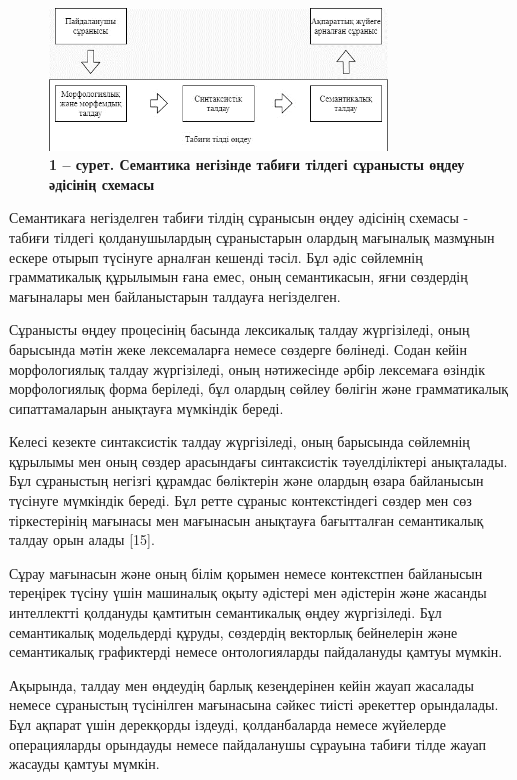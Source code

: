 \begin{figure}[H]
	\centering
	\includegraphics[width=0.8\textwidth]{assets/142}
	\caption*{\bfseries 1 -- сурет. Семантика негізінде табиғи тілдегі сұранысты өңдеу
  әдісінің схемасы}
\end{figure}


Семантикаға негізделген табиғи тілдің сұранысын өңдеу әдісінің схемасы -
табиғи тілдегі қолданушылардың сұраныстарын олардың мағыналық мазмұнын
ескере отырып түсінуге арналған кешенді тәсіл. Бұл әдіс сөйлемнің
грамматикалық құрылымын ғана емес, оның семантикасын, яғни сөздердің
мағыналары мен байланыстарын талдауға негізделген.

Сұранысты өңдеу процесінің басында лексикалық талдау жүргізіледі, оның
барысында мәтін жеке лексемаларға немесе сөздерге бөлінеді. Содан кейін
морфологиялық талдау жүргізіледі, оның нәтижесінде әрбір лексемаға
өзіндік морфологиялық форма беріледі, бұл олардың сөйлеу бөлігін және
грамматикалық сипаттамаларын анықтауға мүмкіндік береді.

Келесі кезекте синтаксистік талдау жүргізіледі, оның барысында сөйлемнің
құрылымы мен оның сөздер арасындағы синтаксистік тәуелділіктері
анықталады. Бұл сұраныстың негізгі құрамдас бөліктерін және олардың
өзара байланысын түсінуге мүмкіндік береді. Бұл ретте сұраныс
контекстіндегі сөздер мен сөз тіркестерінің мағынасы мен мағынасын
анықтауға бағытталған семантикалық талдау орын алады {[}15{]}.

Сұрау мағынасын және оның білім қорымен немесе контекстпен байланысын
тереңірек түсіну үшін машиналық оқыту әдістері мен әдістерін және
жасанды интеллектті қолдануды қамтитын семантикалық өңдеу жүргізіледі.
Бұл семантикалық модельдерді құруды, сөздердің векторлық бейнелерін және
семантикалық графиктерді немесе онтологияларды пайдалануды қамтуы
мүмкін.

Ақырында, талдау мен өңдеудің барлық кезеңдерінен кейін жауап жасалады
немесе сұраныстың түсінілген мағынасына сәйкес тиісті әрекеттер
орындалады. Бұл ақпарат үшін дерекқорды іздеуді, қолданбаларда немесе
жүйелерде операцияларды орындауды немесе пайдаланушы сұрауына табиғи
тілде жауап жасауды қамтуы мүмкін.

